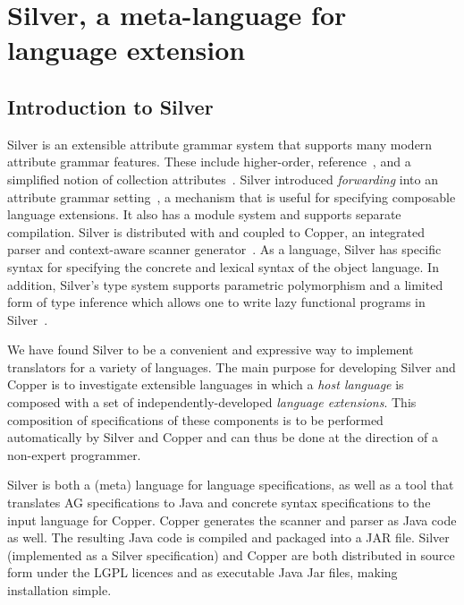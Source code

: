 \newpage
\newcommand{\code}[1]{\texttt{#1}}

\section{Silver, a meta-language for language extension}

\subsection{Introduction to Silver}

Silver is an extensible attribute grammar system that
supports many modern attribute grammar features.  These include
higher-order\cite{vogt89}, reference~\cite{hedin00informatica}, and a
simplified notion of collection attributes~\cite{boyland05}.
%
Silver introduced \emph{forwarding} into an attribute grammar
setting~\cite{vanwyk02}, a mechanism that is useful for specifying
composable language extensions.
%
It also has a module system and supports separate compilation.
%
Silver is distributed with and coupled to Copper, an integrated parser
and context-aware scanner generator~\cite{vanwyk07gpce}.  As a
language, Silver has specific syntax for specifying the concrete and
lexical syntax of the object language.
%
In addition, Silver's type system supports parametric polymorphism and
a limited form of type inference which allows one to write lazy
functional programs in Silver~\cite{kaminski11sle}.



We have found Silver to be a convenient and expressive way to implement
translators for a variety of languages.  The main purpose for
developing Silver and Copper is to investigate extensible languages in
which a \emph{host language} is composed with a set of
independently-developed \emph{language extensions}.  This composition
of specifications of these components is to be performed automatically
by Silver and Copper and can thus be done at the direction of a
non-expert programmer.

Silver is both a (meta) language for language specifications, as well
as a tool that translates AG specifications to Java and concrete
syntax specifications to the input language for Copper.  Copper
generates the scanner and parser as Java code as well.  The resulting
Java code is compiled and packaged into a JAR file.  Silver
(implemented as a Silver specification) and Copper are both
distributed in source form under the LGPL licences and as executable
Java Jar files, making installation simple.


